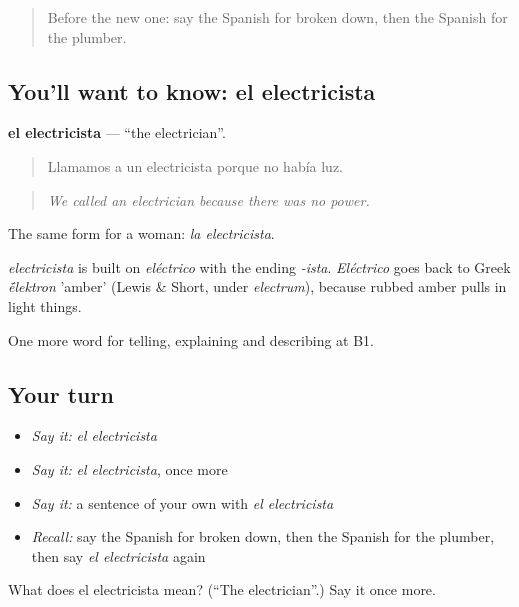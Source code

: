 \label{lesson:ES-C769-electricista}



\begin{quote}
Before the new one: say the Spanish for broken down, then the Spanish for the plumber.
\end{quote}

\subsection*{You'll want to know: el electricista}
\textbf{el electricista} — \textquotedblleft{}the electrician\textquotedblright{}.

\begin{quote}
Llamamos a un electricista porque no había luz.
\end{quote}

\begin{quote}
\emph{We called an electrician because there was no power.}
\end{quote}

The same form for a woman: \emph{la electricista}.

\begin{cousinweb}
\emph{electricista} is built on \emph{eléctrico} with the ending \emph{-ista}. \emph{Eléctrico} goes back to Greek \emph{\'{\={e}}lektron} 'amber' (Lewis \& Short, under \emph{electrum}), because rubbed amber pulls in light things.
\end{cousinweb}

\begin{grammarlens}[title={What you've built}]
One more word for telling, explaining and describing at B1.
\end{grammarlens}

\subsection*{Your turn}
\begin{itemize}
\raggedright
  \item \emph{Say it:} \emph{el electricista}
  \item \emph{Say it:} \emph{el electricista}, once more
  \item \emph{Say it:} a sentence of your own with \emph{el electricista}
  \item \emph{Recall:} say the Spanish for broken down, then the Spanish for the plumber, then say \emph{el electricista} again
\end{itemize}

\begin{tcolorbox}[breakable,colback=teal!4,colframe=teal!35!black,title={Before you move on}]
What does el electricista mean? (\textquotedblleft{}The electrician\textquotedblright{}.) Say it once more.
\end{tcolorbox}
